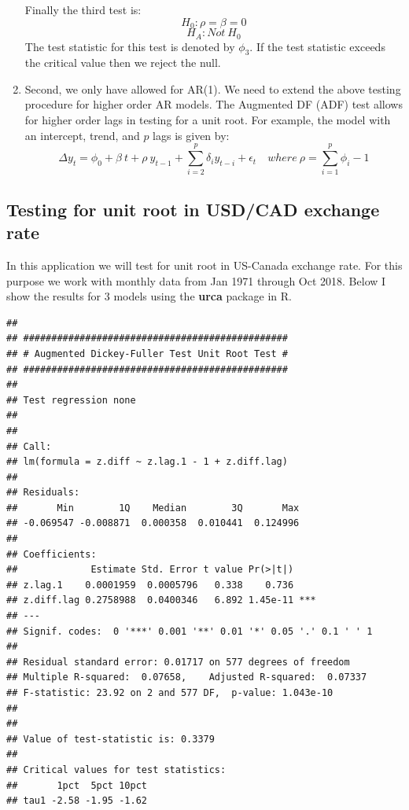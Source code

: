 \documentclass[]{book}
\theoremstyle{definition}
\theoremstyle{definition}
\theoremstyle{definition}
\theoremstyle{remark}
\begin{document}
\begin{enumerate}
  Finally the third test is:
  \[H_0: \rho=\beta=0 \]
  \[H_A: Not \ H_0\]
  The test statistic for this test is denoted by \(\phi_3\). If the test statistic exceeds the critical value then we reject the null.
\item
  Second, we only have allowed for AR(1). We need to extend the above testing procedure for higher order AR models. The Augmented DF (ADF) test allows for higher order lags in testing for a unit root. For example, the model with an intercept, trend, and \(p\) lags is given by:
  \[\Delta y_t= \phi_0 + \beta \ t+ \rho \ y_{t-1}+\sum_{i=2}^p\delta_i  y_{t-i}+\epsilon_t  \quad where \ \rho=\sum_{i=1}^p \phi_i-1\]
\end{enumerate}

\hypertarget{testing-for-unit-root-in-usdcad-exchange-rate}{%
\subsection{Testing for unit root in USD/CAD exchange rate}\label{testing-for-unit-root-in-usdcad-exchange-rate}}

In this application we will test for unit root in US-Canada exchange rate. For this purpose we work with monthly data from Jan 1971 through Oct 2018. Below I show the results for 3 models using the \textbf{urca} package in R.

\begin{verbatim}
## 
## ############################################### 
## # Augmented Dickey-Fuller Test Unit Root Test # 
## ############################################### 
## 
## Test regression none 
## 
## 
## Call:
## lm(formula = z.diff ~ z.lag.1 - 1 + z.diff.lag)
## 
## Residuals:
##       Min        1Q    Median        3Q       Max 
## -0.069547 -0.008871  0.000358  0.010441  0.124996 
## 
## Coefficients:
##             Estimate Std. Error t value Pr(>|t|)    
## z.lag.1    0.0001959  0.0005796   0.338    0.736    
## z.diff.lag 0.2758988  0.0400346   6.892 1.45e-11 ***
## ---
## Signif. codes:  0 '***' 0.001 '**' 0.01 '*' 0.05 '.' 0.1 ' ' 1
## 
## Residual standard error: 0.01717 on 577 degrees of freedom
## Multiple R-squared:  0.07658,    Adjusted R-squared:  0.07337 
## F-statistic: 23.92 on 2 and 577 DF,  p-value: 1.043e-10
## 
## 
## Value of test-statistic is: 0.3379 
## 
## Critical values for test statistics: 
##       1pct  5pct 10pct
## tau1 -2.58 -1.95 -1.62
\end{verbatim}
\end{document}

